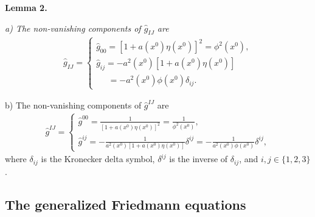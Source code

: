 \documentclass[aps,superscriptaddress, showpacs,preprintnumbers, superscriptaddress, nofootinbibt,twocolumn]{revtex4-2}
\begin{document}
{\bf Lemma 2.}
{\it
a) The non-vanishing components of $\hat{g}_{IJ}$ are
\begin{equation}\label{mF}
\begin{split}
    \hat{g}_{IJ}=\begin{cases}
    \hat{g}_{00}=\left[1+a\left(x^0\right)\eta \left(x^0\right)\right]^2 =\phi ^2\left(x^0\right),\\
    \hat{g}_{ij}= -a^2\left(x^0\right)\left[1+a\left(x^0\right)\eta \left(x^0\right)\right]\\
    \;\;\;\;\;=-a^2\left(x^0\right)\phi \left(x^0\right)\delta_{ij}.
    \end{cases}
\end{split}
\end{equation}

b) The non-vanishing components of $\hat{g}^{IJ}$ are
\begin{equation}
\begin{split}
    \hat{g}^{IJ}=\begin{cases}
    \hat{g}^{00}=\frac{1}{\left[1+a\left(x^0\right)\eta\left( x^0\right)\right]^2}=\frac{1}{\phi^2\left(x^0\right)},\\
    \hat{g}^{ij}= -\frac{1}{a^2\left(x^0\right)\left[1+a\left(x^0\right)\eta\left(x^0\right)\right]}\delta^{ij}=-\frac{1}{a^2\left(x^0\right)\phi \left(x^0\right)}\delta^{ij},
    \end{cases}
\end{split}
 \end{equation}
 \noindent where  $\delta_{ij} $ is the Kronecker delta symbol,  $\delta ^{ij} $ is the inverse of $\delta _{ij}$, and $i,j\in\{1,2,3\}$.
}

\subsection{The generalized Friedmann equations}
\end{document}
